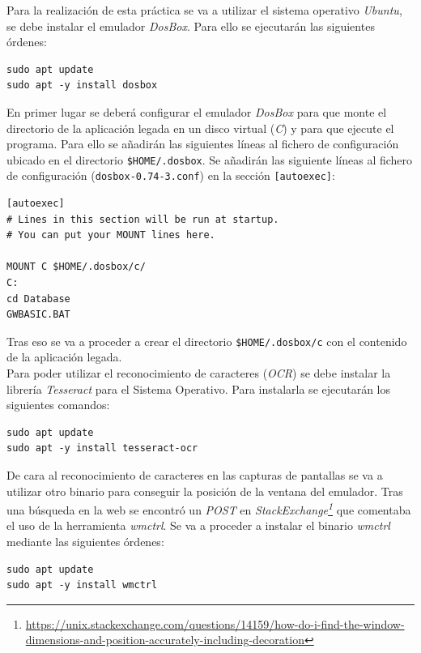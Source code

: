 \documentclass[10pt,a4paper]{article}
\begin{document}
Para la realización de esta práctica se va a utilizar el sistema operativo \emph{Ubuntu}, se debe instalar el emulador \emph{DosBox}. Para ello se ejecutarán las siguientes órdenes:

\begin{lstlisting}
sudo apt update
sudo apt -y install dosbox
\end{lstlisting}


En primer lugar se deberá configurar el emulador \emph{DosBox} para que monte el directorio de la aplicación legada en un disco virtual (\emph{C}) y para que ejecute el programa. Para ello se añadirán las siguientes líneas al fichero de configuración ubicado en el directorio \texttt{\$HOME/.dosbox}. Se añadirán las siguiente líneas al fichero de configuración (\texttt{dosbox-0.74-3.conf}) en la sección \texttt{[autoexec]}:

\begin{lstlisting}
[autoexec]
# Lines in this section will be run at startup.
# You can put your MOUNT lines here.

MOUNT C $HOME/.dosbox/c/
C:
cd Database
GWBASIC.BAT
\end{lstlisting}

Tras eso se va a proceder a crear el directorio \texttt{\$HOME/.dosbox/c} con el contenido de la aplicación legada.\\

Para poder utilizar el reconocimiento de caracteres (\emph{OCR}) se debe instalar la librería \emph{Tesseract} para el Sistema Operativo. Para instalarla se ejecutarán los siguientes comandos:

\begin{lstlisting}
sudo apt update
sudo apt -y install tesseract-ocr
\end{lstlisting}

De cara al reconocimiento de caracteres en las capturas de pantallas se va a utilizar otro binario para conseguir la posición de la ventana del emulador. Tras una búsqueda en la web se encontró un \emph{POST} en \emph{StackExchange\footnote{\url{https://unix.stackexchange.com/questions/14159/how-do-i-find-the-window-dimensions-and-position-accurately-including-decoration}}} que comentaba el uso de la herramienta \emph{wmctrl}. Se va a proceder a instalar el binario \emph{wmctrl} mediante las siguientes órdenes:

\begin{lstlisting}
sudo apt update
sudo apt -y install wmctrl
\end{lstlisting}
\end{document}
